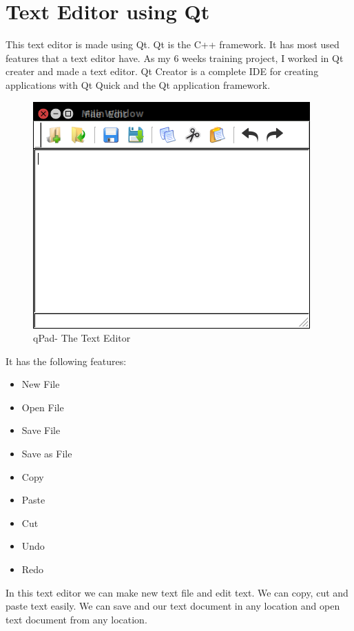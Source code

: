 \section{Text Editor using Qt}
This text editor is made using Qt. Qt is the C++ framework. It has most used features that a text editor have. 
\noindent As my 6 weeks training project,  I worked  in Qt creater and made a text editor.
Qt Creator is a complete IDE for creating applications with Qt Quick and the Qt application framework.
\begin{figure}[h]
\begin{center}
\includegraphics[scale=0.7]{images/dp/qpad.png}
\caption{qPad- The Text Editor}
\end{center}
\end{figure}

It has the following features:
\begin{itemize}
\item New File
\item Open File
\item Save File
\item Save as File
\item Copy
\item Paste
\item Cut
\item Undo
\item Redo
\end{itemize}

In this text editor we can make new text file and edit text. We can copy, cut and paste text easily. We can save and our text document in any location and open text document from any location. 

